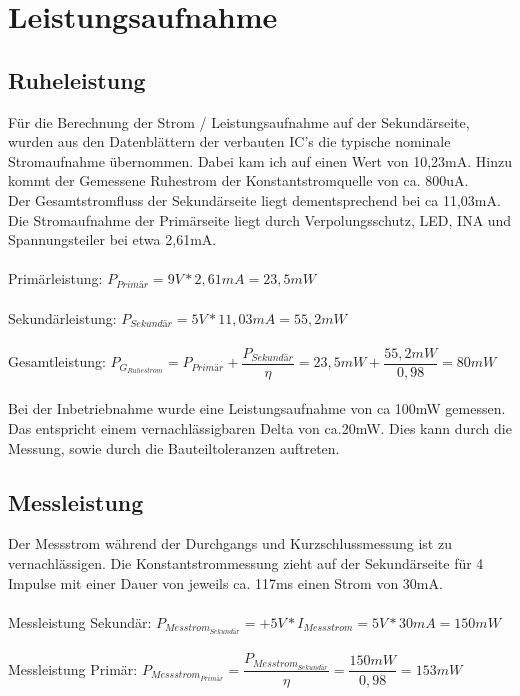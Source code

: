 \section{Leistungsaufnahme}

\subsection{Ruheleistung}
Für die Berechnung der Strom / Leistungsaufnahme auf der Sekundärseite, wurden aus den Datenblättern der verbauten IC's die typische nominale Stromaufnahme übernommen. Dabei kam ich auf einen Wert von 10,23mA. Hinzu kommt der Gemessene Ruhestrom der Konstantstromquelle von ca. 800uA. 
\\
Der Gesamtstromfluss der Sekundärseite liegt dementsprechend bei ca 11,03mA.
\\
Die Stromaufnahme der Primärseite liegt durch Verpolungsschutz, LED, INA und Spannungsteiler bei etwa 2,61mA. 
\\
\\
Primärleistung: $P_{Primär} = 9V * 2,61mA = 23,5mW$
\\
\\
Sekundärleistung: $P_{Sekundär} = 5V * 11,03mA = 55,2mW$
\\
\\
Gesamtleistung: $P_{G_{Ruhestrom}} = P_{Primär} + \dfrac{P_{Sekundär}}{\eta} = 23,5mW + \dfrac{55,2mW}{0,98} = 80mW$
\\
\\
Bei der Inbetriebnahme wurde eine Leistungsaufnahme von ca 100mW gemessen. Das entspricht einem vernachlässigbaren Delta von ca.20mW. Dies kann durch die Messung, sowie durch die Bauteiltoleranzen auftreten.

\subsection{Messleistung}

Der Messstrom während der Durchgangs und Kurzschlussmessung ist zu vernachlässigen. Die Konstantstrommessung zieht auf der Sekundärseite für 4 Impulse mit einer Dauer von jeweils ca. 117ms einen Strom von 30mA.
\\
\\
Messleistung Sekundär: $P_{Messtrom_{Sekundär}} = +5V * I_{Messstrom} = 5V * 30mA = 150mW$
\\
\\
Messleistung Primär: $P_{Messstrom_{Primär}} = \dfrac{P_{Messtrom_{Sekundär}}}{\eta} = \dfrac{150mW}{0,98} = 153mW$


